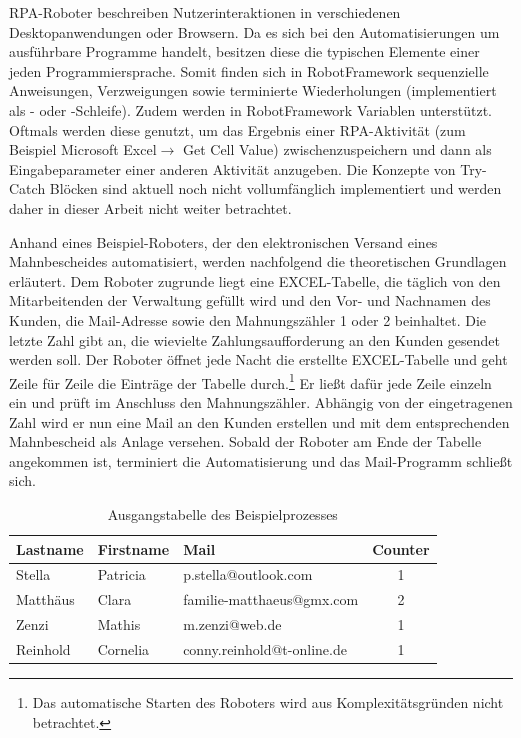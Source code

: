 RPA-Roboter beschreiben Nutzerinteraktionen in verschiedenen Desktopanwendungen oder Browsern. Da es sich bei den Automatisierungen um ausführbare Programme handelt, besitzen diese die typischen Elemente einer jeden Programmiersprache. Somit finden sich in RobotFramework sequenzielle Anweisungen, Verzweigungen sowie terminierte Wiederholungen (implementiert als - oder -Schleife). Zudem werden in RobotFramework Variablen unterstützt. Oftmals werden diese genutzt, um das Ergebnis einer RPA-Aktivität (zum Beispiel \flqq Microsoft Excel\frqq $\rightarrow$ \frqq Get Cell Value\flqq) zwischenzuspeichern und dann als Eingabeparameter einer anderen Aktivität anzugeben. Die Konzepte von Try-Catch Blöcken sind aktuell noch nicht vollumfänglich implementiert und werden daher in dieser Arbeit nicht weiter betrachtet.

Anhand eines Beispiel-Roboters, der den elektronischen Versand eines Mahnbescheides automatisiert, werden nachfolgend die theoretischen Grundlagen erläutert. Dem Roboter zugrunde liegt eine EXCEL-Tabelle, die täglich von den Mitarbeitenden der Verwaltung gefüllt wird und den Vor- und Nachnamen des Kunden, die Mail-Adresse sowie den Mahnungszähler 1 oder 2 beinhaltet. Die letzte Zahl gibt an, die wievielte Zahlungsaufforderung an den Kunden gesendet werden soll. Der Roboter öffnet jede Nacht die erstellte EXCEL-Tabelle und geht Zeile für Zeile die Einträge der Tabelle durch.\footnote{Das automatische Starten des Roboters wird aus Komplexitätsgründen nicht betrachtet.} Er ließt dafür jede Zeile einzeln ein und prüft im Anschluss den Mahnungszähler. Abhängig von der eingetragenen Zahl wird er nun eine Mail an den Kunden erstellen und mit dem entsprechenden Mahnbescheid als Anlage versehen. Sobald der Roboter am Ende der Tabelle angekommen ist, terminiert die Automatisierung und das Mail-Programm schließt sich. 

\begin{table}[h!]
    \centering
    \caption{Ausgangstabelle des Beispielprozesses}
    \begin{tabular}{|l|l|l|c|}
    \hline
    \textbf{Lastname} & \textbf{Firstname} & \textbf{Mail}      & \textbf{Counter} \\ \hline
    Stella        & Patricia         & p.stella@outlook.com       & 1                      \\ \hline
    Matthäus      & Clara            & familie-matthaeus@gmx.com  & 2                      \\ \hline
    Zenzi         & Mathis           & m.zenzi@web.de             & 1                      \\ \hline
    Reinhold      & Cornelia         & conny.reinhold@t-online.de & 1                      \\ \hline
    \end{tabular}
    \label{tab:exampleExcel}
\end{table}

